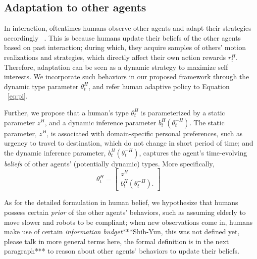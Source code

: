 \documentclass[letterpaper, 10 pt, conference]{ieeeconf}  %
\begin{document}
\subsection{Adaptation to other agents}\label{sec:adaptability}
\vspace{-.2em}
In interaction, oftentimes humans observe other agents and adapt their 
strategies accordingly ~\cite{nikolaidis2016formalizing,yang2017evaluating}. 
This is because humans update their beliefs of the other agents based on past interaction; during which, they acquire samples of others' motion realizations 
and strategies, which directly affect their own action rewards $r^H_t$. 
Therefore, adaptation can be seen as a dynamic strategy to maximize self 
interests. We incorporate such behaviors in our proposed framework 
through the dynamic type parameter $\theta^H_t$, and refer human adaptive 
policy to Equation ~\ref{eq:pi}. 

Further, we propose that a human's type $\theta^H_t$ is parameterized by a 
static parameter $z^H$, and a dynamic inference parameter 
$b^H_t(\theta^{-H}_t)$. The static parameter, $z^H$, is associated with 
domain-specific personal 
preferences, such as urgency to travel to destination, which do not change in 
short period of time; and the 
dynamic inference parameter, $b^H_t(\theta^{-H}_t)$, captures the agent's 
time-evolving \textit{beliefs} of other agents' (potentially dynamic) types. More specifically,
\begin{equation}
  \theta^H_t = \begin{bmatrix}
    z^H \\
    b^H_t(\theta^{-H}_t).
  \end{bmatrix}
\end{equation}

As for the detailed formulation in human belief, we hypothesize that humans 
possess certain \textit{prior} of the other agents' behaviors, such as assuming 
elderly to move slower and robots to be compliant; when new observations come 
in, humans make use of certain \textit{information budget}***Shih-Yun, this was not defined yet, please talk in more general terms here, the formal definition is in the next paragraph*** to reason about 
other agents' behaviors to update their beliefs.

\end{document}
